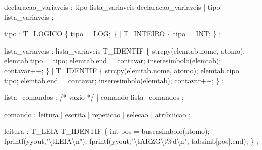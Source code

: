 \documentclass[
  brazilian,
  letterpaper,
]{book}
\newenvironment{Shaded}{\begin{snugshade}}{\end{snugshade}}
\newcommand{\CommentTok}[1]{\textcolor[rgb]{0.37,0.37,0.37}{#1}}
\newcommand{\DataTypeTok}[1]{\textcolor[rgb]{0.68,0.00,0.00}{#1}}
\newcommand{\NormalTok}[1]{\textcolor[rgb]{0.00,0.23,0.31}{#1}}
\newcommand{\OperatorTok}[1]{\textcolor[rgb]{0.37,0.37,0.37}{#1}}
\newcommand{\SpecialCharTok}[1]{\textcolor[rgb]{0.37,0.37,0.37}{#1}}
\newcommand{\StringTok}[1]{\textcolor[rgb]{0.13,0.47,0.30}{#1}}
\theoremstyle{plain}
\theoremstyle{definition}
\theoremstyle{remark}
\begin{document}
\begin{Shaded}
\begin{Highlighting}[]
\NormalTok{declaracao\_variaveis}
    \OperatorTok{:}\NormalTok{ tipo lista\_variaveis declaracao\_variaveis}
    \OperatorTok{|}\NormalTok{ tipo lista\_variaveis}
    \OperatorTok{;}

\NormalTok{tipo}
    \OperatorTok{:}\NormalTok{ T\_LOGICO}
      \OperatorTok{\{}\NormalTok{ tipo }\OperatorTok{=}\NormalTok{ LOG}\OperatorTok{;} \OperatorTok{\}}
    \OperatorTok{|}\NormalTok{ T\_INTEIRO}
      \OperatorTok{\{}\NormalTok{ tipo }\OperatorTok{=}\NormalTok{ INT}\OperatorTok{;} \OperatorTok{\}}
    \OperatorTok{;}

\NormalTok{lista\_variaveis}
    \OperatorTok{:}\NormalTok{ lista\_variaveis T\_IDENTIF}
      \OperatorTok{\{} 
\NormalTok{        strcpy}\OperatorTok{(}\NormalTok{elemtab}\OperatorTok{.}\NormalTok{nome}\OperatorTok{,}\NormalTok{ atomo}\OperatorTok{);}
\NormalTok{        elemtab}\OperatorTok{.}\NormalTok{tipo }\OperatorTok{=}\NormalTok{ tipo}\OperatorTok{;}
\NormalTok{        elemtab}\OperatorTok{.}\NormalTok{end }\OperatorTok{=}\NormalTok{ contavar}\OperatorTok{;}
\NormalTok{        inseresimbolo}\OperatorTok{(}\NormalTok{elemtab}\OperatorTok{);}
\NormalTok{        contavar}\OperatorTok{++;} 
      \OperatorTok{\}}
    \OperatorTok{|}\NormalTok{ T\_IDENTIF}
      \OperatorTok{\{} 
\NormalTok{        strcpy}\OperatorTok{(}\NormalTok{elemtab}\OperatorTok{.}\NormalTok{nome}\OperatorTok{,}\NormalTok{ atomo}\OperatorTok{);}
\NormalTok{        elemtab}\OperatorTok{.}\NormalTok{tipo }\OperatorTok{=}\NormalTok{ tipo}\OperatorTok{;}
\NormalTok{        elemtab}\OperatorTok{.}\NormalTok{end }\OperatorTok{=}\NormalTok{ contavar}\OperatorTok{;}
\NormalTok{        inseresimbolo}\OperatorTok{(}\NormalTok{elemtab}\OperatorTok{);}
\NormalTok{        contavar}\OperatorTok{++;} 
      \OperatorTok{\}}
    \OperatorTok{;}

\NormalTok{lista\_comandos}
    \OperatorTok{:} \CommentTok{/* vazio */}
    \OperatorTok{|}\NormalTok{ comando lista\_comandos}
    \OperatorTok{;}

\NormalTok{comando}
    \OperatorTok{:}\NormalTok{ leitura}
    \OperatorTok{|}\NormalTok{ escrita}
    \OperatorTok{|}\NormalTok{ repeticao}
    \OperatorTok{|}\NormalTok{ selecao}
    \OperatorTok{|}\NormalTok{ atribuicao}
    \OperatorTok{;}

\NormalTok{leitura}
    \OperatorTok{:}\NormalTok{ T\_LEIA T\_IDENTIF}
       \OperatorTok{\{}
        \DataTypeTok{int}\NormalTok{ pos }\OperatorTok{=}\NormalTok{ buscasimbolo}\OperatorTok{(}\NormalTok{atomo}\OperatorTok{);} 
\NormalTok{        fprintf}\OperatorTok{(}\NormalTok{yyout}\OperatorTok{,}\StringTok{"}\SpecialCharTok{\textbackslash{}t}\StringTok{LEIA}\SpecialCharTok{\textbackslash{}n}\StringTok{"}\OperatorTok{);}
\NormalTok{        fprintf}\OperatorTok{(}\NormalTok{yyout}\OperatorTok{,}\StringTok{"}\SpecialCharTok{\textbackslash{}t}\StringTok{ARZG}\SpecialCharTok{\textbackslash{}t\%d\textbackslash{}n}\StringTok{"}\OperatorTok{,}\NormalTok{ tabsimb}\OperatorTok{[}\NormalTok{pos}\OperatorTok{].}\NormalTok{end}\OperatorTok{);} 
       \OperatorTok{\}}
    \OperatorTok{;}


\end{Highlighting}
\end{Shaded}
\end{document}

